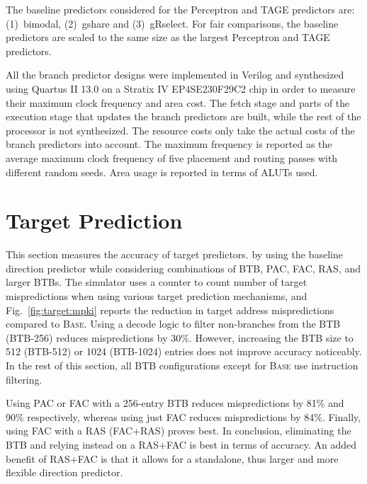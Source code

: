 The baseline predictors considered for the Perceptron and TAGE predictors are: (1)~bimodal, (2)~gshare and (3)~gRselect. For fair comparisons, the baseline predictors are scaled to the same size as the largest Perceptron and TAGE predictors.

All the branch predictor designs were implemented in Verilog and synthesized using Quartus II 13.0 on a Stratix IV EP4SE230F29C2 chip in order to measure their maximum clock frequency and area cost. The fetch stage and parts of the execution stage that updates the branch predictors are built, while the rest of the processor is not synthesized. The resource costs only take the actual costs of the branch predictors into account. The maximum frequency is reported as the average maximum clock frequency of five placement and routing passes with different random seeds. Area usage is reported in terms of ALUTs used.

\section{Target Prediction}
\label{sec:eval:target}

This section measures the accuracy of target predictors. by using the baseline direction predictor while considering combinations of BTB, PAC, FAC, RAS, and larger BTBs. The simulator uses a counter to count number of target mispredictions when using various target prediction mechanisms, and Fig.~\ref{fig:target:mpki} reports the reduction in target address mispredictions compared to \textsc{Base}. Using a decode logic to filter non-branches from the BTB (BTB-256) reduces mispredictions by 30\%. However, increasing the BTB size to 512 (BTB-512) or 1024 (BTB-1024) entries does not improve accuracy noticeably. In the rest of this section, all BTB configurations except for \textsc{Base} use instruction filtering.

Using PAC or FAC with a 256-entry BTB reduces mispredictions by 81\% and 90\% respectively, whereas using just FAC reduces mispredictions by 84\%. Finally, using FAC with a RAS (FAC+RAS) proves best. In conclusion, eliminating the BTB and relying instead on a RAS+FAC is best in terms of accuracy. An added benefit of RAS+FAC is that it allows for a standalone, thus larger and more flexible direction predictor. 


